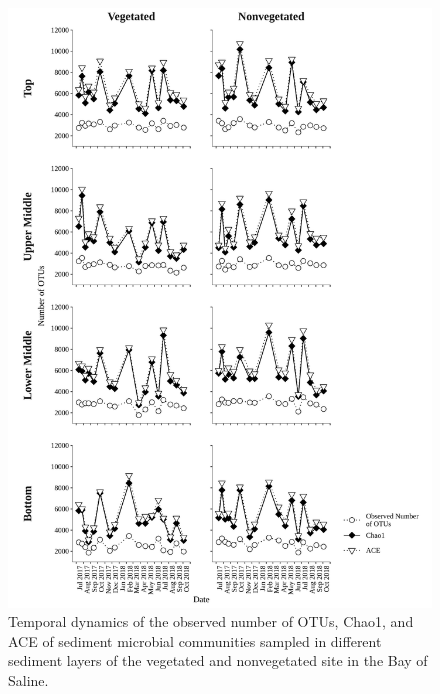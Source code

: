 \documentclass[12pt,]{article}
\begin{document}
\begin{figure}[H]

{\centering \includegraphics[width=0.9\linewidth,height=1\textheight]{../results/figures/estimators_months} 

}

\caption{Temporal dynamics of the observed number of OTUs, Chao1, and ACE of sediment microbial communities sampled in different sediment layers of the vegetated and nonvegetated site in the Bay of Saline.\label{estimators_moths}}\label{fig:unnamed-chunk-3}
\end{figure}
\end{document}
